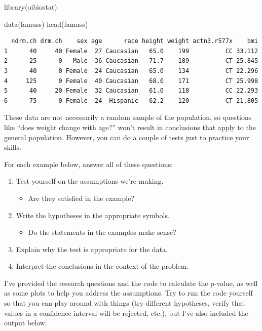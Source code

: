 \documentclass[
  letterpaper,
  DIV=11,
  numbers=noendperiod,
  oneside]{scrreprt}
\newenvironment{Shaded}{\begin{snugshade}}{\end{snugshade}}
\newcommand{\FunctionTok}[1]{\textcolor[rgb]{0.28,0.35,0.67}{#1}}
\newcommand{\NormalTok}[1]{\textcolor[rgb]{0.00,0.23,0.31}{#1}}
\providecommand{\tightlist}{%
  \setlength{\itemsep}{0pt}\setlength{\parskip}{0pt}}\usepackage{longtable,booktabs,array}
\begin{document}
\begin{Shaded}
\begin{Highlighting}[]
\FunctionTok{library}\NormalTok{(oibiostat)}

\FunctionTok{data}\NormalTok{(famuss)}
\FunctionTok{head}\NormalTok{(famuss)}
\end{Highlighting}
\end{Shaded}

\begin{verbatim}
  ndrm.ch drm.ch    sex age      race height weight actn3.r577x    bmi
1      40     40 Female  27 Caucasian   65.0    199          CC 33.112
2      25      0   Male  36 Caucasian   71.7    189          CT 25.845
3      40      0 Female  24 Caucasian   65.0    134          CT 22.296
4     125      0 Female  40 Caucasian   68.0    171          CT 25.998
5      40     20 Female  32 Caucasian   61.0    118          CC 22.293
6      75      0 Female  24  Hispanic   62.2    120          CT 21.805
\end{verbatim}

These data are not necessarily a random sample of the population, so
questions like ``does weight change with age?'' won't result in
conclusions that apply to the general population. However, you can do a
couple of tests just to practice your skills.

For each example below, answer all of these questions:

\begin{enumerate}
\def\labelenumi{\arabic{enumi}.}
\tightlist
\item
  Test yourself on the assumptions we're making.

  \begin{itemize}
  \tightlist
  \item
    Are they satisfied in the example?
  \end{itemize}
\item
  Write the hypotheses in the appropriate symbols.

  \begin{itemize}
  \tightlist
  \item
    Do the statements in the examples make sense?
  \end{itemize}
\item
  Explain why the test is appropriate for the data.
\item
  Interpret the conclusions in the context of the problem.
\end{enumerate}

I've provided the research questions and the code to calculate the
p-value, as well as some plots to help you address the assumptions. Try
to run the code yourself so that you can play around with things (try
different hypotheses, verify that values in a confidence interval will
be rejected, etc.), but I've also included the output below.
\end{document}
